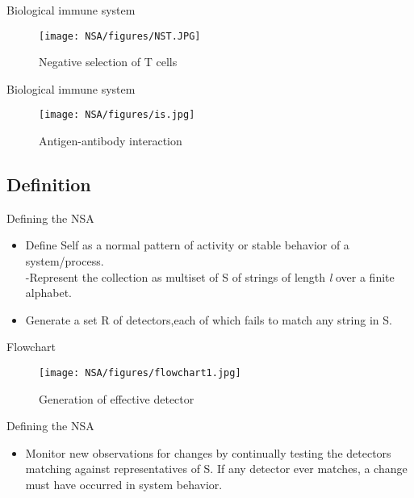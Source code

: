 \begin{frame}{Biological immune system}
  \begin{figure}[hb]
  \centering
  \texttt{[image: NSA/figures/NST.JPG]}
  \caption{Negative selection of T cells}
  \end{figure}
\end{frame}

\begin{frame}{Biological immune system}
  \begin{figure}[hb]
  \centering
  \texttt{[image: NSA/figures/is.jpg]}
  \caption{Antigen-antibody interaction}
  \end{figure}
\end{frame}


\subsection{Definition}

\begin{frame}{Defining the NSA}
  \begin{itemize}
  \item<1->{
    Define Self as a normal pattern of activity or stable behavior of a system/process.\\
    -Represent the collection as multiset of S of strings of length \emph{l} over a finite alphabet.
  }
  \item<2-> {   
    Generate a set R of detectors,each of which fails to match any string in S.
  }
  
  \end{itemize}
\end{frame}
 
\begin{frame}{Flowchart}
  \begin{figure}[hb]
  \centering
  \texttt{[image: NSA/figures/flowchart1.jpg]}
  \caption{Generation of effective detector}
  \end{figure}
\end{frame}

\begin{frame}{Defining the NSA}
  \begin{itemize}
  \item {
    Monitor new observations for changes by continually testing the detectors matching against representatives of S.  If any detector ever matches, a change must have occurred in system behavior.
  }
  \end{itemize}
\end{frame}

